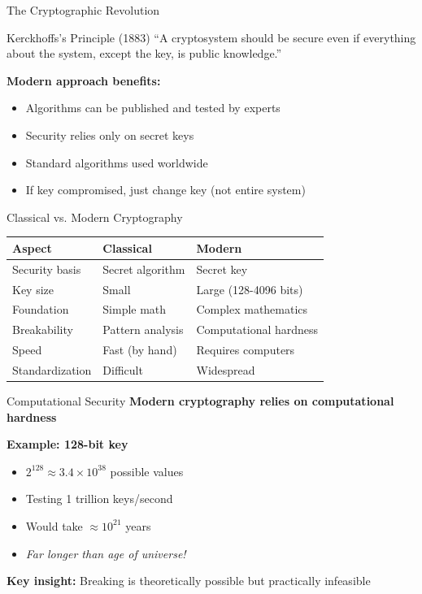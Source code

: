 \documentclass{beamer}
\begin{document}
\begin{frame}{The Cryptographic Revolution}
\begin{block}{Kerckhoffs's Principle (1883)}
``A cryptosystem should be secure even if everything about the system, except the key, is public knowledge.''
\end{block}

\vspace{0.3cm}
\textbf{Modern approach benefits:}
\begin{itemize}
    \item Algorithms can be published and tested by experts
    \item Security relies only on secret keys
    \item Standard algorithms used worldwide
    \item If key compromised, just change key (not entire system)
\end{itemize}
\end{frame}

\begin{frame}{Classical vs. Modern Cryptography}
\begin{center}
\begin{tabular}{|l|l|l|}
\hline
\textbf{Aspect} & \textbf{Classical} & \textbf{Modern} \\
\hline
Security basis & Secret algorithm & Secret key \\
Key size & Small & Large (128-4096 bits) \\
Foundation & Simple math & Complex mathematics \\
Breakability & Pattern analysis & Computational hardness \\
Speed & Fast (by hand) & Requires computers \\
Standardization & Difficult & Widespread \\
\hline
\end{tabular}
\end{center}

\end{frame}

\begin{frame}{Computational Security}
\textbf{Modern cryptography relies on computational hardness}

\vspace{0.3cm}
\textbf{Example: 128-bit key}
\begin{itemize}
    \item $2^{128} \approx 3.4 \times 10^{38}$ possible values
    \item Testing 1 trillion keys/second
    \item Would take $\approx 10^{21}$ years
    \item \emph{Far longer than age of universe!}
\end{itemize}

\vspace{0.3cm}
\textbf{Key insight:}
Breaking is theoretically possible but practically infeasible
\end{frame}
\end{document}
